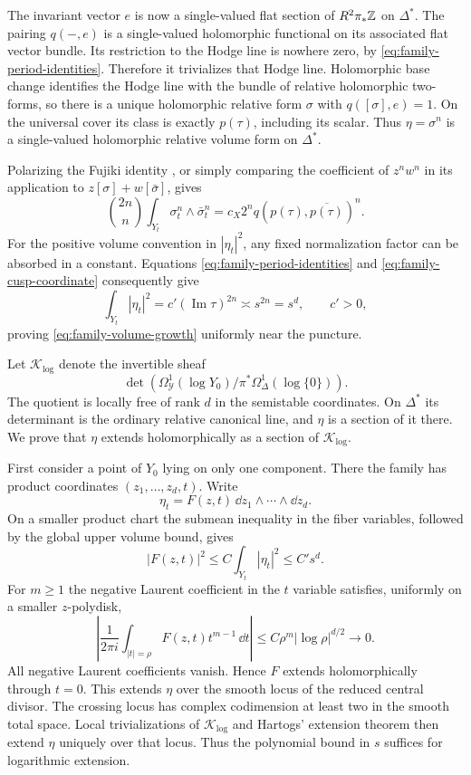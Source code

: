 The invariant vector $e$ is now a single-valued flat section of
$R^2\pi_*\mathbb Z$ on $\Delta^*$.  The pairing $q(-,e)$ is a
single-valued holomorphic functional on its associated flat
vector bundle.  Its restriction to the Hodge line is nowhere
zero, by \eqref{eq:family-period-identities}.  Therefore it
trivializes that Hodge line.  Holomorphic base change identifies
the Hodge line with the bundle of relative holomorphic two-forms,
so there is a unique holomorphic relative form $\sigma$ with
$q([\sigma],e)=1$.  On the universal cover its class is exactly
$p(\tau)$, including its scalar.  Thus $\eta=\sigma^n$ is a
single-valued holomorphic relative volume form on $\Delta^*$.

Polarizing the Fujiki identity \cite{Fujiki}, or simply comparing
the coefficient of $z^nw^n$ in its application to
$z[\sigma]+w[\bar\sigma]$, gives
\[
 \binom{2n}{n}\int_{Y_t}\sigma_t^n\wedge\bar\sigma_t^n
       =c_X2^n q(p(\tau),\overline{p(\tau)})^n.
\]
For the positive volume convention in $|\eta_t|^2$, any fixed
normalization factor can be absorbed in a constant.  Equations
\eqref{eq:family-period-identities} and
\eqref{eq:family-cusp-coordinate} consequently give
\[
 \int_{Y_t}|\eta_t|^2
       =c' (\operatorname{Im}\tau)^{2n}\asymp s^{2n}=s^d,
 \qquad c'>0,
\]
proving \eqref{eq:family-volume-growth} uniformly near the puncture.

Let $\mathcal K_{\log}$ denote the invertible sheaf
\[
 \det\!\left(
 \Omega^1_{\mathcal Y}(\log Y_0)
 \big/\pi^*\Omega^1_{\Delta}(\log\{0\})\right).
\]
The quotient is locally free of rank $d$ in the semistable
coordinates.  On $\Delta^*$ its determinant is the ordinary
relative canonical line, and $\eta$ is a section of it there.
We prove that $\eta$ extends holomorphically as a section of
$\mathcal K_{\log}$.

First consider a point of $Y_0$ lying on only one component.
There the family has product coordinates $(z_1,\ldots,z_d,t)$.
Write
\[
 \eta_t=F(z,t)\,\dd z_1\wedge\cdots\wedge\dd z_d.
\]
On a smaller product chart the submean inequality in the fiber
variables, followed by the global upper volume bound, gives
\[
 |F(z,t)|^2\le C\int_{Y_t}|\eta_t|^2\le C' s^d.
\]
For $m\ge1$ the negative Laurent coefficient in the $t$ variable
satisfies, uniformly on a smaller $z$-polydisk,
\[
 \left|\frac1{2\pi i}\int_{|t|=\rho}
                  F(z,t)t^{m-1}\,\dd t\right|
       \le C\rho^m|\log\rho|^{d/2}\longrightarrow0.
\]
All negative Laurent coefficients vanish.  Hence $F$ extends
holomorphically through $t=0$.  This extends $\eta$ over the
smooth locus of the reduced central divisor.  The crossing locus
has complex codimension at least two in the smooth total space.
Local trivializations of $\mathcal K_{\log}$ and Hartogs'
extension theorem then extend $\eta$ uniquely over that locus.
Thus the polynomial bound in $s$ suffices for logarithmic extension.

